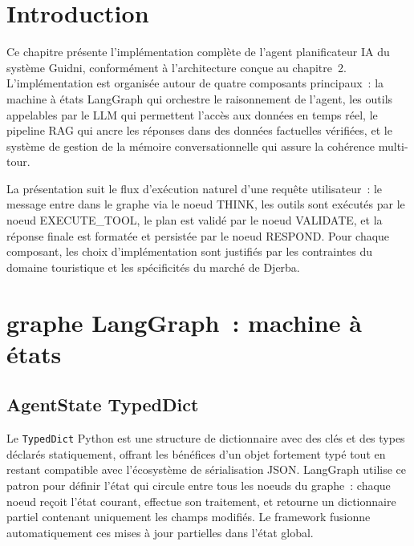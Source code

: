 
\section{Introduction}

Ce chapitre présente l'implémentation complète de l'agent planificateur IA du système Guidni,
conformément à l'architecture conçue au chapitre~2. L'implémentation est organisée autour de
quatre composants principaux~: la machine à états LangGraph qui orchestre le raisonnement de
l'agent, les outils appelables par le LLM qui permettent l'accès aux données en temps réel,
le pipeline RAG qui ancre les réponses dans des données factuelles vérifiées, et le système de
gestion de la mémoire conversationnelle qui assure la cohérence multi-tour.

La présentation suit le flux d'exécution naturel d'une requête utilisateur~: le message entre
dans le graphe via le noeud THINK, les outils sont exécutés par le noeud EXECUTE\_TOOL, le plan
est validé par le noeud VALIDATE, et la réponse finale est formatée et persistée par le noeud
RESPOND. Pour chaque composant, les choix d'implémentation sont justifiés par les contraintes
du domaine touristique et les spécificités du marché de Djerba.


\section{graphe LangGraph~: machine à états}

\subsection{AgentState TypedDict}

Le \texttt{TypedDict} Python est une structure de dictionnaire avec des clés et des types
déclarés statiquement, offrant les bénéfices d'un objet fortement typé tout en restant
compatible avec l'écosystème de sérialisation JSON. LangGraph utilise ce patron pour définir
l'état qui circule entre tous les noeuds du graphe~: chaque noeud reçoit l'état courant, effectue
son traitement, et retourne un dictionnaire partiel contenant uniquement les champs modifiés.
Le framework fusionne automatiquement ces mises à jour partielles dans l'état global.


